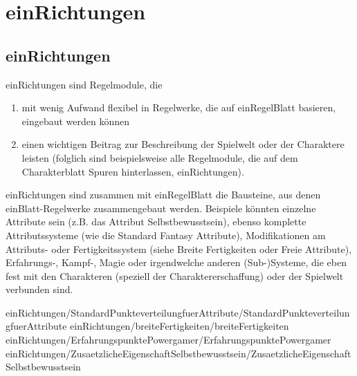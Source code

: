 \part {einRichtungen}
\chapter {einRichtungen}
einRichtungen sind Regelmodule, die
\begin{enumerate}
\item mit wenig Aufwand flexibel in Regelwerke, die auf einRegelBlatt basieren, eingebaut werden können
\item einen wichtigen Beitrag zur Beschreibung der Spielwelt oder der Charaktere leisten (folglich sind beispielsweise alle Regelmodule, die auf dem Charakterblatt Spuren hinterlassen, einRichtungen).
\end{enumerate}
einRichtungen sind zusammen mit einRegelBlatt die Bausteine, aus denen einBlatt-Regelwerke zusammengebaut werden.
Beispiele könnten einzelne Attribute sein (z.B. das Attribut Selbstbewusstsein), ebenso komplette Attributssysteme (wie die Standard Fantasy Attribute), Modifikationen am Attributs- oder Fertigkeitssystem (siehe Breite Fertigkeiten oder Freie Attribute), Erfahrungs-, Kampf-, Magie oder irgendwelche anderen (Sub-)Systeme, die eben fest mit den Charakteren (speziell der Charaktererschaffung) oder der Spielwelt verbunden sind.

 {einRichtungen/StandardPunkteverteilungfuerAttribute/StandardPunkteverteilungfuerAttribute} 
 {einRichtungen/breiteFertigkeiten/breiteFertigkeiten}
 {einRichtungen/ErfahrungspunktePowergamer/ErfahrungspunktePowergamer}
 {einRichtungen/ZusaetzlicheEigenschaftSelbstbewusstsein/ZusaetzlicheEigenschaftSelbstbewusstsein}
